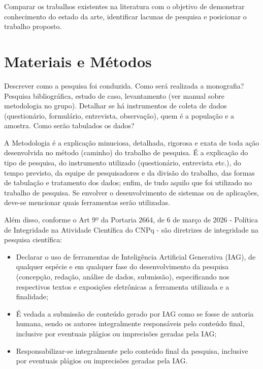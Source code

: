 \documentclass[
	12pt,				    %
	openright,			    %
	oneside,			    %
	a4paper,			    %
    sumario=tradicional,    %
	english,			    %
	brazil,				    %
	]{abntex2}
\begin{document}
Comparar os trabalhos existentes na literatura com o objetivo de demonstrar conhecimento do estado da arte, identificar lacunas de pesquisa e posicionar o trabalho proposto.

\chapter{Materiais e Métodos}\label{sec:metodos}

Descrever como a pesquisa foi conduzida. Como será realizada a monografia? Pesquisa bibliográfica, estudo de caso, levantamento (ver manual sobre metodologia no grupo). Detalhar se há instrumentos de coleta de dados (questionário, formulário, entrevista, observação), quem é a população e a amostra. Como serão tabulados os dados?  

A Metodologia é a explicação minuciosa, detalhada, rigorosa e exata de toda ação desenvolvida no método (caminho) do trabalho de pesquisa. É a explicação do tipo de pesquisa, do instrumento utilizado (questionário, entrevista etc.), do tempo previsto, da equipe de pesquisadores e da divisão do trabalho, das formas de tabulação e tratamento dos dados; enfim, de tudo aquilo que foi utilizado no trabalho de pesquisa. Se envolver o desenvolvimento de sistemas ou de aplicações, deve-se mencionar quais ferramentas serão utilizadas. 

Além disso, conforme o Art 9º da Portaria 2664, de 6 de março de 2026 - Política de Integridade na Atividade Científica do CNPq - são diretrizes de integridade na pesquisa científica:

\begin{itemize}
    \item Declarar o uso de ferramentas de Inteligência Artificial Generativa (IAG), de qualquer espécie e em qualquer fase do desenvolvimento da pesquisa (concepção, redação, análise de dados, submissão), especificando nos respectivos textos e exposições eletrônicas a ferramenta utilizada e a finalidade;
    \item É vedada a submissão de conteúdo gerado por IAG como se fosse de autoria humana, sendo os autores integralmente responsáveis pelo conteúdo final, inclusive por eventuais plágios ou imprecisões geradas pela IAG;
    \item Responsabilizar-se integralmente pelo conteúdo final da pesquisa, inclusive por eventuais plágios ou imprecisões geradas pela IAG.
\end{itemize}
\end{document}
